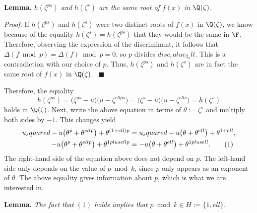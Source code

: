 \textbf{Lemma.} \emph{$h(\zeta^{ps})$ and $h(\zeta^{s})$ are the same root of $f(x)$ in $\Q(\zeta)$.}

\textit{Proof.} If $h(\zeta^{ps})$ and $h(\zeta^{s})$ were two distinct roots of $f(x)$ in $\Q(\zeta)$, we know because of the equality $h(\zeta^{s})=h(\zeta^{ps})$ that they would be the same in $\F$. Therefore, observing the expression of the discriminant, it follows that $\Delta(f \bmod{p})=\Delta(f) \bmod{p}=0$, so $p$ divides ${disc_value_2_alt}$. This is a contradiction with our choice of $p$. Thus, $h(\zeta^{ps})$ and $h(\zeta^{s})$ are in fact the same root of $f(x)$ in $\Q(\zeta)$. \ $\blacksquare$

Therefore, the equality
\begin{equation*}
h(\zeta^{ps})=\big(\zeta^{ps}-{u}\big)\big({{u}}-\zeta^{{ell}ps}\big)=\big(\zeta^{s}-{u}\big)\big({{u}}-\zeta^{{ell}s}\big)=h(\zeta^{s})
\end{equation*}
holds in $\Q(\zeta)$. Next, write the above equation in terms of $\theta:=\zeta^{s}$ and multiply both sides by $-1$. This changes yield
\begin{align}
{u_squared}-{{u}}\big(\theta^{p}+\theta^{{ell}p}\big)+\theta^{(1+{ell})p}&={u_squared}-{{u}}\big(\theta+\theta^{{ell}}\big)+\theta^{1+{ell}}, \notag \\
-{u}\big(\theta^{p}+\theta^{{ell}p}\big)+\theta^{{1plusell}p}&=-{u}\big(\theta+\theta^{{ell}}\big)+\theta^{{1plusell}}. \quad \quad (1)
\end{align}
The right-hand side of the equation above does not depend on $p$. The left-hand side only depends on the value of $p\bmod{{k}}$, since $p$ only appears as an exponent of $\theta$. The above equality gives information about $p$, which is what we are interested in. 

\textbf{Lemma.} \emph{The fact that $(1)$ holds implies that $p \bmod{{k}}\in H:=\{1,{ell}\}$.}

